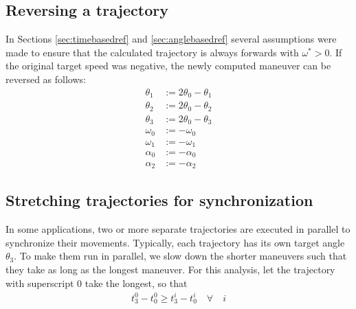 \documentclass[12pt, a4paper]
{article}
\providecommand{\w}{\omega}
\providecommand{\wt}{\w^*}
\renewcommand{\th}{\theta}
\renewcommand{\a}{\alpha}
\begin{document}
\subsection{Reversing a trajectory}
\label{sec:invert}
In Sections \ref{sec:timebasedref} and \ref{sec:anglebasedref} several
assumptions were made to ensure that the calculated trajectory is always
forwards with $\wt > 0$. If the original target speed was negative, the
newly computed maneuver can be reversed as follows:
%
\begin{align}
    \th_1 &:= 2 \th_0 - \th_1\\[1em]
    \th_2 &:= 2 \th_0 - \th_2\\[1em]
    \th_3 &:= 2 \th_0 - \th_3\\[1em]
    \w_0 &:= -\w_0\\[1em]
    \w_1 &:= -\w_1\\[1em]
    \a_0 &:= -\a_0\\[1em]
    \a_2 &:= -\a_2
\end{align}

\subsection{Stretching trajectories for synchronization}

In some applications, two or more separate trajectories are executed in
parallel to synchronize their movements. Typically, each trajectory has its own
target angle $\th_3$. To make them run in parallel, we slow down the shorter
maneuvers such that they take as long as the longest maneuver. For this
analysis, let the trajectory with superscript $0$ take the longest, so that
%
\begin{align}
    t^0_3 - t^0_0 \geq t^i_3 - t^i_0  \quad \forall \quad i
\end{align}
\end{document}
